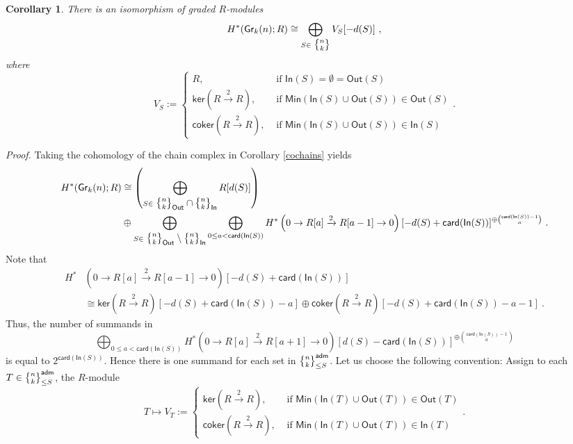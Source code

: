 \documentclass{article}
\newcommand{\msf}[1]{\mathsf{#1}}
\newcommand{\gr}{\msf{Gr}}
\newcommand{\nchoosek}{\textstyle\genfrac{\lbrace}{\rbrace}{0pt}{}}
\newcommand{\card}{\msf{card}}
\newcommand{\In}{\msf{In}}
\newcommand{\Out}{\msf{Out}}
\newcommand{\adm}{\msf{adm}}
\newcommand{\coker}{\msf{coker}}
\renewcommand{\ker}{\msf{ker}}
\newtheorem{corollary}[theorem]{Corollary}
\theoremstyle{definition}
\begin{document}
\begin{corollary}\label{cohomologyFormula}
    There is an isomorphism of graded $R$-modules
    $$H^*(\gr_k(n);R) \cong \bigoplus_{S \in \nchoosek{n}{k}} V_S[-d(S)]~,$$
    where 
    $$V_S := \begin{cases}
                            R, &\text{ if } \msf{In}(S)  = \emptyset = \msf{Out}(S) \\
                            \ker(R\xrightarrow{2}R), &\text{ if } \msf{Min}(\In(S) \cup \Out(S)) \in \Out(S) \\
                            \coker(R\xrightarrow{2}R), &\text{ if } \msf{Min}(\In(S) \cup \Out(S)) \in \In(S)
                    \end{cases}.$$
\end{corollary}
{\it Proof.} 
Taking the cohomology of the chain complex in Corollary \ref{cochains} yields
\begin{align*}
    H^*(\gr_k(n);R)
    &\cong \left( \bigoplus_{S \in \nchoosek{n}{k}_\Out \cap \nchoosek{n}{k}_\In}
        R[d(S)]\right) \\
    &\oplus\bigoplus_{S \in \nchoosek{n}{k}_\Out \setminus \nchoosek{n}{k}_\In}
        \bigoplus_{0 \le a < \card(\In(S))} H^*\left(0 \to R[a] \xrightarrow{2} R[a-1] \to 0\right)[-d(S)+\card(\In(S))]^{
        \oplus {\card(\In(S))-1 \choose a}} ~.
\end{align*}
Note that
\begin{align*}
    H^*&\left(0 \to R[a] \xrightarrow{2} R[a-1] \to 0\right)[-d(S)+\card(\In(S))] \\
    &\cong
    \ker(R\xrightarrow{2}R)[-d(S)+\card(\In(S))-a] \oplus \coker(R\xrightarrow{2}R)[-d(S)+\card(\In(S))-a-1]~.
\end{align*}
Thus, the number of summands in 
$$\bigoplus_{0 \le a < \card(\In(S))} H^*\left(0 \to R[a] \xrightarrow{2} R[a+1] \to 0\right)[d(S)-\card(\In(S))]^{
        \oplus {\card(\In(S))-1 \choose a}}$$
is equal to $2^{\card(\In(S))}$. Hence there is one summand for each set in
$\nchoosek{n}{k}^\adm_{\le S}$. Let us choose the following convention: Assign to each
$T \in \nchoosek{n}{k}^\adm_{\le S}$, the $R$-module
$$T \mapsto V_T :=\begin{cases} \ker(R\xrightarrow{2}R), &\text{ if } \msf{Min}(\In(T) \cup \Out(T)) \in \Out(T) \\
                                                        \coker(R\xrightarrow{2}R), &\text{ if } \msf{Min}(\In(T) \cup \Out(T)) \in \In(T)
                                \end{cases}.$$
\end{document}
